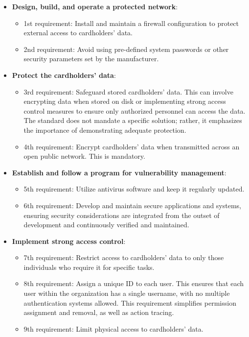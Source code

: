 \begin{itemize}
    \item \textbf{Design, build, and operate a protected network}:
    \begin{itemize}
        \item 1st requirement: Install and maintain a firewall configuration to protect external access to cardholders' data.
        \item 2nd requirement: Avoid using pre-defined system passwords or other security parameters set by the manufacturer.
    \end{itemize}

    \item \textbf{Protect the cardholders' data}:
    \begin{itemize}
        \item 3rd requirement: Safeguard stored cardholders' data. This can involve encrypting data when stored on disk or implementing strong access control measures to ensure only authorized personnel can access the data. The standard does not mandate a specific solution; rather, it emphasizes the importance of demonstrating adequate protection.
        \item 4th requirement: Encrypt cardholders' data when transmitted across an open public network. This is mandatory.
    \end{itemize}

    \item \textbf{Establish and follow a program for vulnerability management}:
    \begin{itemize}
        \item 5th requirement: Utilize antivirus software and keep it regularly updated.
        \item 6th requirement: Develop and maintain secure applications and systems, ensuring security considerations are integrated from the outset of development and continuously verified and maintained.
    \end{itemize}

    \item \textbf{Implement strong access control}:
    \begin{itemize}
        \item 7th requirement: Restrict access to cardholders' data to only those individuals who require it for specific tasks.
        \item 8th requirement: Assign a unique ID to each user. This ensures that each user within the organization has a single username, with no multiple authentication systems allowed. This requirement simplifies permission assignment and removal, as well as action tracing.
        \item 9th requirement: Limit physical access to cardholders' data.
    \end{itemize}


\end{itemize}

